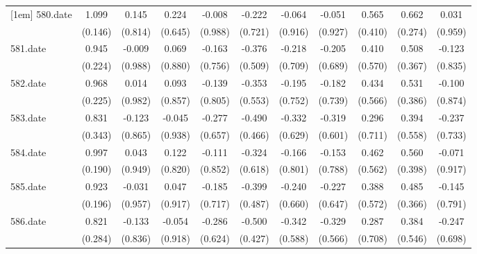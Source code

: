 \begin{tabular}{l*{10}{c}}
[1em]
580.date    &       1.099&       0.145&       0.224&      -0.008&      -0.222&      -0.064&      -0.051&       0.565&       0.662&       0.031\\
            &     (0.146)&     (0.814)&     (0.645)&     (0.988)&     (0.721)&     (0.916)&     (0.927)&     (0.410)&     (0.274)&     (0.959)\\
[1em]
581.date    &       0.945&      -0.009&       0.069&      -0.163&      -0.376&      -0.218&      -0.205&       0.410&       0.508&      -0.123\\
            &     (0.224)&     (0.988)&     (0.880)&     (0.756)&     (0.509)&     (0.709)&     (0.689)&     (0.570)&     (0.367)&     (0.835)\\
[1em]
582.date    &       0.968&       0.014&       0.093&      -0.139&      -0.353&      -0.195&      -0.182&       0.434&       0.531&      -0.100\\
            &     (0.225)&     (0.982)&     (0.857)&     (0.805)&     (0.553)&     (0.752)&     (0.739)&     (0.566)&     (0.386)&     (0.874)\\
[1em]
583.date    &       0.831&      -0.123&      -0.045&      -0.277&      -0.490&      -0.332&      -0.319&       0.296&       0.394&      -0.237\\
            &     (0.343)&     (0.865)&     (0.938)&     (0.657)&     (0.466)&     (0.629)&     (0.601)&     (0.711)&     (0.558)&     (0.733)\\
[1em]
584.date    &       0.997&       0.043&       0.122&      -0.111&      -0.324&      -0.166&      -0.153&       0.462&       0.560&      -0.071\\
            &     (0.190)&     (0.949)&     (0.820)&     (0.852)&     (0.618)&     (0.801)&     (0.788)&     (0.562)&     (0.398)&     (0.917)\\
[1em]
585.date    &       0.923&      -0.031&       0.047&      -0.185&      -0.399&      -0.240&      -0.227&       0.388&       0.485&      -0.145\\
            &     (0.196)&     (0.957)&     (0.917)&     (0.717)&     (0.487)&     (0.660)&     (0.647)&     (0.572)&     (0.366)&     (0.791)\\
[1em]
586.date    &       0.821&      -0.133&      -0.054&      -0.286&      -0.500&      -0.342&      -0.329&       0.287&       0.384&      -0.247\\
            &     (0.284)&     (0.836)&     (0.918)&     (0.624)&     (0.427)&     (0.588)&     (0.566)&     (0.708)&     (0.546)&     (0.698)\\

\end{tabular}
